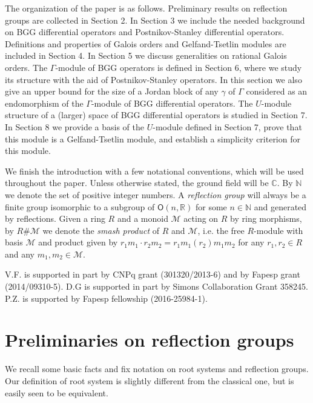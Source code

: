\documentclass[11pt,fleqn]{amsart}
\newcommand\NN{\mathbb N}
\newcommand\RR{\mathbb R}
\begin{document}
The organization of the paper is as follows. Preliminary results on reflection groups are collected in Section 2. In Section 3 we include the needed background on BGG differential operators and Postnikov-Stanley differential operators. Definitions and properties of Galois orders and Gelfand-Tsetlin modules are included in Section 4. In Section 5 we discuss generalities on rational Galois orders. The  $\Gamma$-module of BGG operators is defined in Section 6, where we study its structure with the aid of Postnikov-Stanley  operators. In this section we also give an upper bound for the size of a Jordan block of any $\gamma$ of $\Gamma$ considered as an endomorphism of the $\Gamma$-module of BGG differential operators. The $U$-module structure of a (larger) space of BGG differential operators is studied in  Section 7. In Section 8 we provide a basis of the $U$-module defined in Section 7, prove that this module is a Gelfand-Tsetlin module, and establish a simplicity criterion for this module.

We finish the introduction with a few notational conventions, which will be 
used throughout the paper. Unless otherwise stated, the ground field will be 
$\mathbb C$. By $\mathbb N$ we denote the set of positive integer numbers. 
A \emph{reflection group} will always be a finite group isomorphic to a 
subgroup of $\mathsf O(n, \RR)$ for some $n \in \NN$ and generated by reflections.
Given a ring $R$ and a monoid $\mathcal M$ acting on $R$ by ring morphisms,
 by $R \# \mathcal M$ we denote the \emph{smash product} of $R$ and $\mathcal 
M$, i.e. the free $R$-module with basis $\mathcal M$ and product given by
$r_1 m_1 \cdot r_2 m_2 = r_1 m_1(r_2) m_1m_2$ for any $r_1, r_2 \in R$ and
any $m_1, m_2 \in \mathcal M$.

 V.F. is
supported in part by CNPq grant (301320/2013-6) and by 
Fapesp grant (2014/09310-5). D.G is supported in part by Simons Collaboration 
Grant 358245. P.Z. is supported by Fapesp fellowship (2016-25984-1). 

\section{Preliminaries on reflection groups}
We recall some basic facts and fix notation on root systems and reflection 
groups. Our definition of root system is slightly different from the classical
one, but is easily seen to be equivalent.
\end{document}
